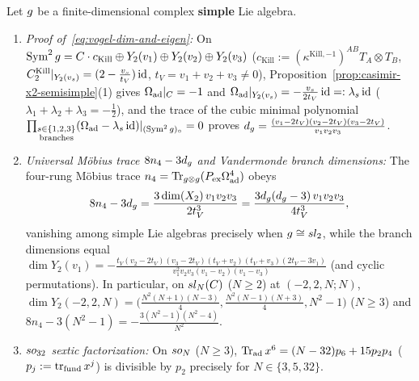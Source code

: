 \begin{theorem}
\label{thm:vogel-dim-and-8n4}
\label{prop:vogel-8n4-identity}\label{lem:vogel-sln-so8}
Let $g$ be a finite-dimensional complex \textbf{simple} Lie algebra.
\begin{enumerate}[label=(\arabic*),leftmargin=*]
  \item \emph{Proof of~\eqref{eq:vogel-dim-and-eigen}:} On $\operatorname{Sym}^2g = C\cdot c_{\mathrm{Kill}} \oplus Y_2(v_1)\oplus Y_2(v_2)\oplus Y_2(v_3)$ ($c_{\mathrm{Kill}} := (\kappa^{\mathrm{Kill},-1})^{AB}T_A\otimes T_B$, $C_2^{\mathrm{Kill}}|_{Y_2(v_s)} = (2 - \frac{v_s}{t_V})\operatorname{id}$, $t_V = v_1+v_2+v_3 \neq 0$), Proposition~\ref{prop:casimir-x2-semisimple}(1) gives $\Omega_{\mathrm{ad}}|_{C} = -1$ and $\Omega_{\mathrm{ad}}|_{Y_2(v_s)} = -\frac{v_s}{2t_V}\operatorname{id} =: \lambda_s\operatorname{id}$ ($\lambda_1+\lambda_2+\lambda_3 = -\frac{1}{2}$), and the trace of the cubic minimal polynomial $\prod_{\substack{s\in\{1,2,3\}\\\mathrm{branches}}}(\Omega_{\mathrm{ad}} - \lambda_s\operatorname{id})|_{(\operatorname{Sym}^2g)_\circ} = 0$ proves $d_{g} = \frac{(v_1 - 2t_V)(v_2 - 2t_V)(v_3 - 2t_V)}{v_1 v_2 v_3}$.

  \item \emph{Universal M\"obius trace $8n_4 - 3d_{g}$ and Vandermonde branch dimensions:} The four-rung M\"obius trace $n_4 = \operatorname{Tr}_{g\otimes g}(P_{\mathrm{ex}}\Omega_{\mathrm{ad}}^4)$ obeys
  \begin{equation}
  \label{eq:vogel-8n4-proof-eq}
  8n_4 - 3d_{g} = \frac{3\dim(X_2)\,v_1 v_2 v_3}{2t_V^3} = \frac{3d_{g}(d_{g} - 3)\,v_1 v_2 v_3}{4t_V^3},
  \end{equation}
  vanishing among simple Lie algebras precisely when $g \cong sl_2$, while the branch dimensions equal $\dim Y_2(v_1) = -\frac{t_V(v_2-2t_V)(v_3-2t_V)(t_V+v_2)(t_V+v_3)(2t_V-3v_1)}{v_1^2 v_2 v_3(v_1-v_2)(v_1-v_3)}$ (and cyclic permutations). In particular, on $sl_N(C)$ ($N \ge 2$) at $(-2,2,N;N)$, $\dim Y_2(-2,2,N) = \bigl(\frac{N^2(N+1)(N-3)}{4}, \frac{N^2(N-1)(N+3)}{4}, N^2-1\bigr)$ ($N \ge 3$) and $8n_4 - 3(N^2-1) = -\frac{3(N^2-1)(N^2-4)}{N^2}$.

  \item \emph{$so_{32}$ sextic factorization:} On $so_N$ ($N \ge 3$), $\operatorname{Tr}_{\mathrm{ad}}x^6 = (N-32)p_6 + 15p_2 p_4$ ($p_j := \operatorname{tr}_{\mathrm{fund}}x^j$) is divisible by $p_2$ precisely for $N \in \{3, 5, 32\}$.
\end{enumerate}
\end{theorem}


